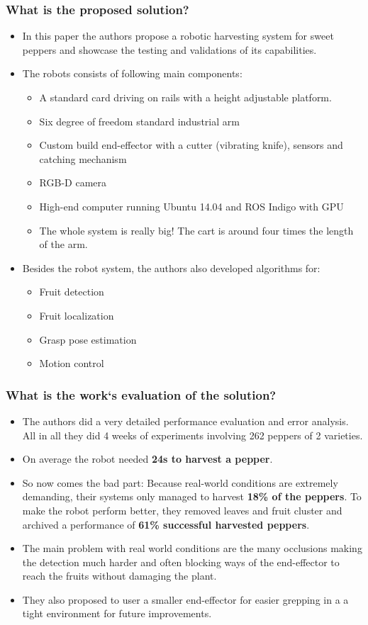 \documentclass{article}
\begin{document}
\subsubsection*{What is the proposed solution?}
\begin{itemize}
    \item In this paper the authors propose a robotic harvesting system for sweet peppers and showcase the testing and validations of its capabilities.
    \item The robots consists of following main components: \begin{itemize}
        \item A standard card driving on rails with a height adjustable platform. 
        \item Six degree of freedom standard industrial arm
        \item Custom build end-effector with a cutter (vibrating knife), sensors and catching mechanism
        \item RGB-D camera 
        \item High-end computer running Ubuntu 14.04 and ROS Indigo with GPU
        \item The whole system is really big! The cart is around four times the length of the arm.
    \end{itemize}
    \item Besides the robot system, the authors also developed algorithms for: \begin{itemize}
        \item Fruit detection
        \item Fruit localization
        \item Grasp pose estimation
        \item Motion control
    \end{itemize}
\end{itemize}
\subsubsection*{What is the work`s evaluation of the solution?}
\begin{itemize}
    \item The authors did a very detailed performance evaluation and error analysis. All in all they did 4 weeks of experiments involving 262 peppers of 2 varieties.
    \item On average the robot needed \textbf{24s to harvest a pepper}.
    \item So now comes the bad part: Because real-world conditions are extremely demanding, their systems only managed to
    harvest \textbf{18\% of the peppers}. To make the robot perform better, they removed leaves and fruit cluster and archived 
    a performance of \textbf{61\% successful harvested peppers}.
    \item The main problem with real world conditions are the many occlusions making the detection much harder and often 
    blocking ways of the end-effector to reach the fruits without damaging the plant.
    \item They also proposed to user a smaller end-effector for easier grepping in a a tight environment for future improvements.
\end{itemize}
\end{document}
